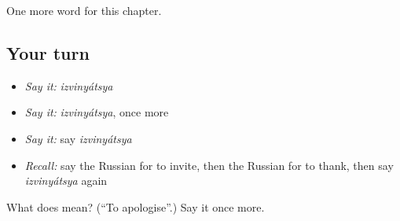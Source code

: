 \begin{grammarlens}[title={What you've built}]
One more word for this chapter.
\end{grammarlens}

\subsection*{Your turn}
\begin{itemize}
\raggedright
  \item \emph{Say it:} \emph{izvinyátsya}
  \item \emph{Say it:} \emph{izvinyátsya}, once more
  \item \emph{Say it:} say \emph{izvinyátsya}
  \item \emph{Recall:} say the Russian for to invite, then the Russian for to thank, then say \emph{izvinyátsya} again
\end{itemize}

\begin{tcolorbox}[breakable,colback=teal!4,colframe=teal!35!black,title={Before you move on}]
What does  mean? (\textquotedblleft{}To apologise\textquotedblright{}.) Say it once more.
\end{tcolorbox}
